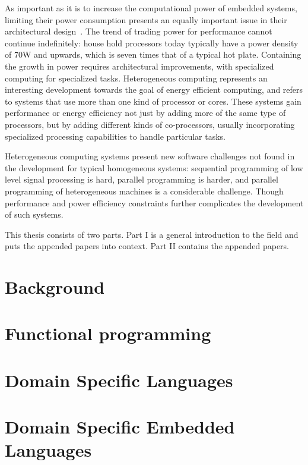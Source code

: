 As important as it is to increase the computational power of embedded systems, limiting their power consumption presents an equally important issue in their architectural design~\cite{mudge2001}. The trend of trading power for performance cannot continue indefinitely: house hold processors today typically have a power density of 70W and upwards, which is seven times that of a typical hot plate. Containing the growth in power requires architectural improvements, with specialized computing for specialized tasks. Heterogeneous computing represents an interesting development towards the goal of energy efficient computing, and refers to systems that use more than one kind of processor or cores. These systems gain performance or energy efficiency not just by adding more of the same type of processors, but by adding different kinds of co-processors, usually incorporating specialized processing capabilities to handle particular tasks.

Heterogeneous computing systems present new software challenges not found in the development for typical homogeneous systems: sequential programming of low level signal processing is hard, parallel programming is harder, and parallel programming of heterogeneous machines is a considerable challenge. Though performance and power efficiency constraints further complicates the development of such systems.

This thesis consists of two parts. Part I is a general introduction to the field and puts the appended papers into context. Part II contains the appended papers.

\section{Background}

\lipsum[1]

\section{Functional programming}

\lipsum[2]

\section{Domain Specific Languages}

\lipsum[3]

\section{Domain Specific Embedded Languages}


